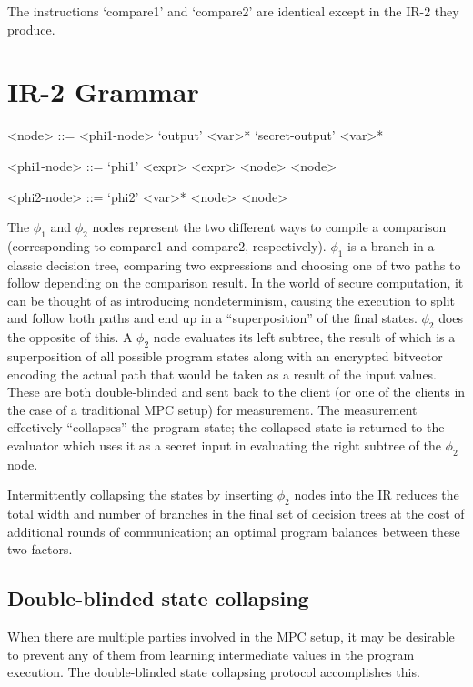 \documentclass{article}
\begin{document}
The instructions `compare1' and `compare2' are identical except in the IR-2 they produce.
\section{IR-2 Grammar}
\begin{grammar}
    <node> ::= <phi1-node>  \alt `output' <var>* \alt `secret-output' <var>*

    <phi1-node> ::= `phi1' <expr> <expr> <node> <node>

    <phi2-node> ::= `phi2' <var>* <node> <node>
\end{grammar}
The $\phi_1$ and $\phi_2$ nodes represent the two different ways to compile a comparison (corresponding to compare1 and compare2, respectively).
$\phi_1$ is a branch in a classic decision tree, comparing two expressions and choosing one of two paths to follow depending on the comparison result.
In the world of secure computation, it can be thought of as introducing nondeterminism, causing the execution to split and follow both paths and end up in a ``superposition'' of the final states.
$\phi_2$ does the opposite of this.
A $\phi_2$ node evaluates its left subtree, the result of which is a superposition of all possible program states along with an encrypted bitvector encoding the actual path that would be taken as a result of the input values.
These are both double-blinded and sent back to the client (or one of the clients in the case of a traditional MPC setup) for measurement.
The measurement effectively ``collapses'' the program state; the collapsed state is returned to the evaluator which uses it as a secret input in evaluating the right subtree of the $\phi_2$ node.

Intermittently collapsing the states by inserting $\phi_2$ nodes into the IR reduces the total width and number of branches in the final set of decision trees at the cost of additional rounds of communication; an optimal program balances between these two factors.
\subsection{Double-blinded state collapsing}
When there are multiple parties involved in the MPC setup, it may be desirable to prevent any of them from learning intermediate values in the program execution.
The double-blinded state collapsing protocol accomplishes this.
\end{document}
